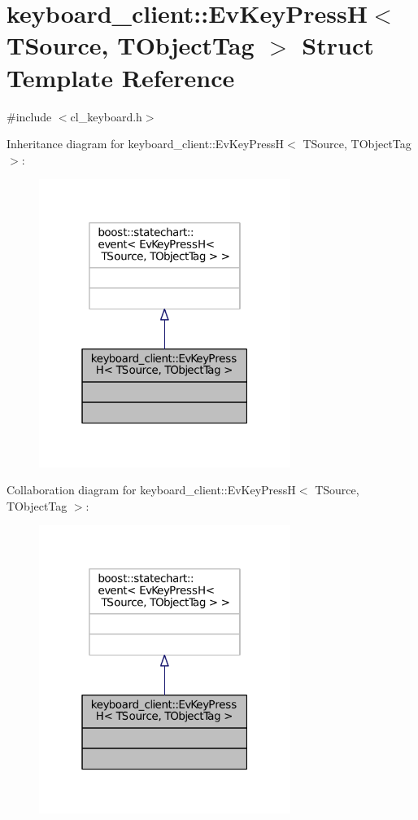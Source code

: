 \hypertarget{structkeyboard__client_1_1EvKeyPressH}{}\section{keyboard\+\_\+client\+:\+:Ev\+Key\+PressH$<$ T\+Source, T\+Object\+Tag $>$ Struct Template Reference}
\label{structkeyboard__client_1_1EvKeyPressH}


{\ttfamily \#include $<$cl\+\_\+keyboard.\+h$>$}



Inheritance diagram for keyboard\+\_\+client\+:\+:Ev\+Key\+PressH$<$ T\+Source, T\+Object\+Tag $>$\+:
\nopagebreak
\begin{figure}[H]
\begin{center}
\leavevmode
\includegraphics[width=232pt]{structkeyboard__client_1_1EvKeyPressH__inherit__graph}
\end{center}
\end{figure}


Collaboration diagram for keyboard\+\_\+client\+:\+:Ev\+Key\+PressH$<$ T\+Source, T\+Object\+Tag $>$\+:
\nopagebreak
\begin{figure}[H]
\begin{center}
\leavevmode
\includegraphics[width=232pt]{structkeyboard__client_1_1EvKeyPressH__coll__graph}
\end{center}
\end{figure}


